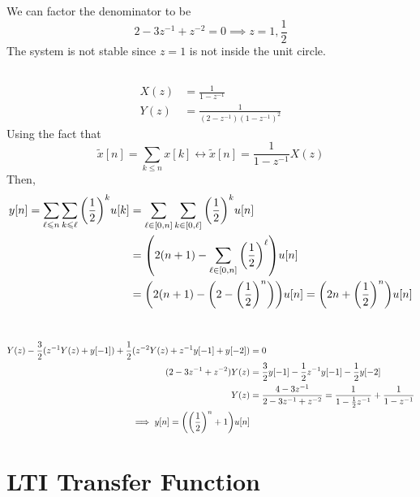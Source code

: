\documentclass{article}
\begin{document}
We can factor the denominator to be
\begin{equation}
    2 - 3z^{-1} + z^{-2} = 0 \implies z = 1, \frac{1}{2}
\end{equation}
The system is not stable since \(z = 1\) is not inside the unit circle.

\subsection{}

\begin{align}
    X(z) &= \frac{1}{1 - z^{-1}} \\
    Y(z) &= \frac{1}{(2 - z^{-1}) (1 - z^{-1})^2}
\end{align}
Using the fact that
\begin{equation}
    \widetilde{x}[n] = \sum_{k \leqslant n} x[k] \longleftrightarrow \widetilde{x}[n] = \frac{1}{1 - z^{-1}} X(z)
\end{equation}
Then,
\begin{align}
    y[n] = \sum_{\ell \leqslant n} \sum_{k \leqslant \ell} \qty(\frac{1}{2})^k u[k] &= \sum_{\ell \in [0, n]} \sum_{k \in [0, \ell]} \qty(\frac{1}{2})^k u[n] \\
    &= \qty(2 (n + 1) - \sum_{\ell \in [0, n]} \qty(\frac{1}{2})^\ell) u[n] \\
    &= \qty(2 (n + 1) - \qty(2 - \qty(\frac{1}{2})^n)) u[n] = \qty(2n + \qty(\frac{1}{2})^n) u[n]
\end{align}

\section{}

\begin{align}
    Y(z) - \frac{3}{2} (z^{-1} Y(z) + y[-1]) + \frac{1}{2} (z^{-2} Y(z) + z^{-1} y[-1] + y[-2]) &= 0 \\
    (2 - 3z^{-1} + z^{-2}) Y(z) &= \frac{3}{2} y[-1] - \frac{1}{2} z^{-1} y[-1] - \frac{1}{2} y[-2] \\
    Y(z) &= \frac{4 - 3z^{-1}}{2 - 3z^{-1} + z^{-2}} = \frac{1}{1 - \frac{1}{2} z^{-1}} + \frac{1}{1 - z^{-1}} \\
    \implies y[n] = \qty(\qty(\frac{1}{2})^n + 1) u[n]
\end{align}

\section{LTI Transfer Function}
\end{document}
